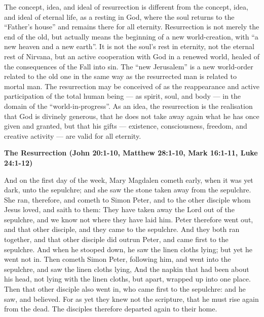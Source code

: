 \begin{quotex}
The concept, idea, and ideal of resurrection is different from the concept, idea, and ideal of eternal life, as a resting in God, where the soul returns to the ``Father's house'' and remains there for all eternity. Resurrection is not merely the end of the old, but actually means the beginning of a new world-creation, with ``a new heaven and a new earth''. It is not the soul's rest in eternity, not the eternal rest of Nirvana, but an active cooperation with God in a renewed world, healed of the consequences of the Fall into sin. The ``new Jerusalem'' is a new world-order related to the old one in the same way as the resurrected man is related to mortal man. The resurrection may be conceived of as the reappearance and active participation of the total human being — as spirit, soul, and body — in the domain of the ``world-in-­progress''. As an idea, the resurrection is the realisation that God is divinely generous, that he does not take away again what he has once given and granted, but that his gifts — existence, consciousness, freedom, and creative activity — are valid for all eternity. 

\end{quotex}

\textbf{The Resurrection (John 20:1-10, Matthew 28:1-10, Mark 16:1-11, Luke 24:1-12)}

And on the first day of the week, Mary Magdalen cometh early, when it was yet dark, unto the sepulchre; and she saw the stone taken away from the sepulchre. She ran, therefore, and cometh to Simon Peter, and to the other disciple whom Jesus loved, and saith to them: They have taken away the Lord out of the sepulchre, and we know not where they have laid him. Peter therefore went out, and that other disciple, and they came to the sepulchre. And they both ran together, and that other disciple did outrun Peter, and came first to the sepulchre. And when he stooped down, he saw the linen cloths lying; but yet he went not in. Then cometh Simon Peter, following him, and went into the sepulchre, and saw the linen cloths lying, And the napkin that had been about his head, not lying with the linen cloths, but apart, wrapped up into one place. Then that other disciple also went in, who came first to the sepulchre: and he saw, and believed. For as yet they knew not the scripture, that he must rise again from the dead. The disciples therefore departed again to their home.

